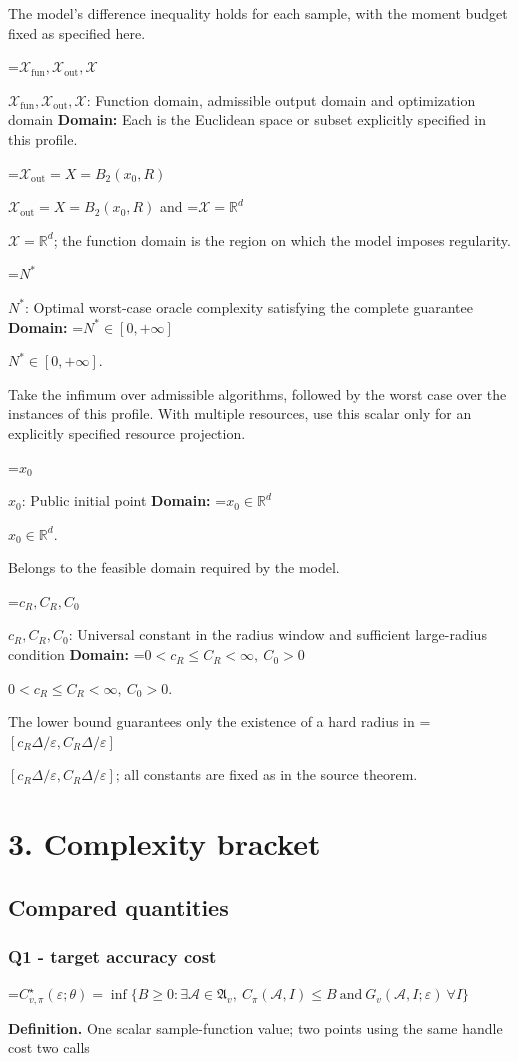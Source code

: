 \documentclass[10pt,a4paper]{article}
\newcommand{\AtlasMath}[1]{\par\begingroup\centering\setbox0=\hbox{$\displaystyle #1$}\ifdim\wd0>1.4\linewidth\typeout{ATLAS WIDE FORMULA: \the\wd0}\fi\ifdim\wd0>\linewidth\resizebox{\linewidth}{!}{\box0}\else\box0\fi\par\endgroup}
\newcommand{\AtlasInlineMath}[1]{\begingroup\setbox0=\hbox{$#1$}\ifdim\wd0>.4\linewidth\endgroup\AtlasMath{#1}\else\endgroup$#1$\fi}
\begin{document}
The model's difference inequality holds for each sample, with the moment budget fixed as specified here.

\AtlasInlineMath{\mathcal{X}_{\mathrm{fun}},\mathcal{X}_{\mathrm{out}},\mathcal{X}}: Function domain, admissible output domain and optimization domain \textbf{Domain:} Each is the Euclidean space or subset explicitly specified in this profile.

\AtlasInlineMath{\mathcal{X}_{\mathrm{out}}=X=B_2(x_0,R)} and \AtlasInlineMath{\mathcal{X}=\mathbb{R}^d}; the function domain is the region on which the model imposes regularity.

\AtlasInlineMath{N^*}: Optimal worst-case oracle complexity satisfying the complete guarantee \textbf{Domain:} \AtlasInlineMath{N^*\in[0,+\infty]}.

Take the infimum over admissible algorithms, followed by the worst case over the instances of this profile. With multiple resources, use this scalar only for an explicitly specified resource projection.

\AtlasInlineMath{x_0}: Public initial point \textbf{Domain:} \AtlasInlineMath{x_0\in\mathbb{R}^d}.

Belongs to the feasible domain required by the model.

\AtlasInlineMath{c_R,C_R,C_0}: Universal constant in the radius window and sufficient large-radius condition \textbf{Domain:} \AtlasInlineMath{0<c_R\le C_R<\infty,\ C_0>0}.

The lower bound guarantees only the existence of a hard radius in \AtlasInlineMath{[c_R\Delta/\varepsilon,C_R\Delta/\varepsilon]}; all constants are fixed as in the source theorem.

\section{3. Complexity bracket}
\subsection{Compared quantities}
\subsubsection{Q1 - target accuracy cost}
\AtlasMath{C^\star_{v,\pi}(\varepsilon;\theta)=\inf\{B\ge0:\exists\mathcal A\in\mathfrak A_v,\ C_\pi(\mathcal A,I)\le B\ \text{and}\ G_v(\mathcal A,I;\varepsilon)\ \forall I\}}
\textbf{Definition.} One scalar sample-function value; two points using the same handle cost two calls
\end{document}

